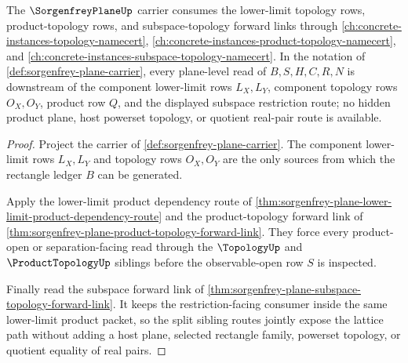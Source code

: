 \begin{theorem}
\label{thm:sorgenfrey-plane-lower-limit-product-sibling-route}
The $\SorgenfreyPlaneUp$ carrier consumes the lower-limit topology rows, product-topology rows, and subspace-topology forward links through \autoref{ch:concrete-instances-topology-namecert}, \autoref{ch:concrete-instances-product-topology-namecert}, and \autoref{ch:concrete-instances-subspace-topology-namecert}. In the notation of \autoref{def:sorgenfrey-plane-carrier}, every plane-level read of $B,S,H,C,R,N$ is downstream of the component lower-limit rows $L_X,L_Y$, component topology rows $O_X,O_Y$, product row $Q$, and the displayed subspace restriction route; no hidden product plane, host powerset topology, or quotient real-pair route is available.
\end{theorem}
\begin{proof}
Project the carrier of \autoref{def:sorgenfrey-plane-carrier}. The component lower-limit rows $L_X,L_Y$ and topology rows $O_X,O_Y$ are the only sources from which the rectangle ledger $B$ can be generated.

Apply the lower-limit product dependency route of \autoref{thm:sorgenfrey-plane-lower-limit-product-dependency-route} and the product-topology forward link of \autoref{thm:sorgenfrey-plane-product-topology-forward-link}. They force every product-open or separation-facing read through the $\TopologyUp$ and $\ProductTopologyUp$ siblings before the observable-open row $S$ is inspected.

Finally read the subspace forward link of \autoref{thm:sorgenfrey-plane-subspace-topology-forward-link}. It keeps the restriction-facing consumer inside the same lower-limit product packet, so the split sibling routes jointly expose the lattice path without adding a host plane, selected rectangle family, powerset topology, or quotient equality of real pairs.
\end{proof}
